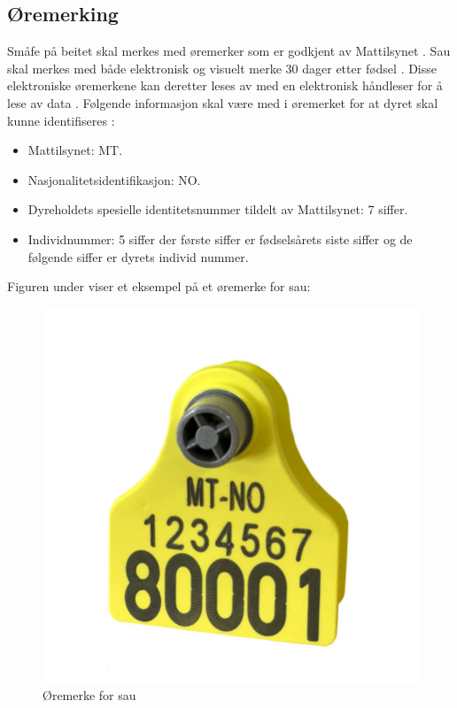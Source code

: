 \subsection{Øremerking}
Småfe på beitet skal merkes med øremerker som er godkjent av Mattilsynet \cite{2005ForskriftSmafe}. Sau skal merkes med både elektronisk og visuelt merke 30 dager etter fødsel \cite{Mattilsynet2013remerkingSmafe}. Disse elektroniske øremerkene kan deretter leses av med en elektronisk håndleser for å lese av data \cite[~s.48]{BungerSmafenaring2018}. Følgende informasjon skal være med i øremerket for at dyret skal kunne identifiseres \cite{2005ForskriftSmafe}: 
\begin{itemize}
    \item Mattilsynet: MT.
    \item Nasjonalitetsidentifikasjon: NO.
    \item Dyreholdets spesielle identitetsnummer tildelt av Mattilsynet: 7 siffer.
    \item Individnummer: 5 siffer der første siffer er fødselsårets siste siffer og de følgende siffer er dyrets individ nummer.
\end{itemize}
Figuren under viser et eksempel på et øremerke for sau: 

\begin{figure}[H]
\centering
\includegraphics[scale=0.25]{Figurer/Bilder/oremerke.jpg}
\caption{Øremerke for sau}
\label{fig:oremerke}
\end{figure}

